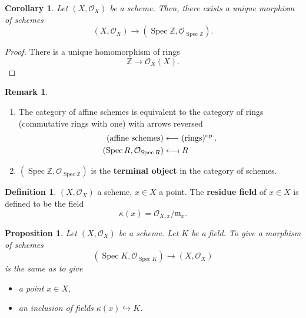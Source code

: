 \documentclass[12pt]{article}
\DeclareMathOperator{\Spec}{Spec}
\newtheorem*{proposition}{Proposition}
\newtheorem*{corollary}{Corollary}
\theoremstyle{definition}
\newtheorem*{definition}{Definition}
\newtheorem*{remark}{Remark}
\begin{document}
\begin{corollary}
Let $(X,\mathcal{O}_X)$ be a scheme. Then, there exists a unique morphism of schemes
\[(X,\mathcal{O}_X)\longrightarrow(\Spec\mathbb{Z},\mathcal{O}_{\Spec\mathbb{Z}}).\]
\end{corollary}

\begin{proof}
There is a unique homomorphism of rings
\[\mathbb{Z}\longrightarrow\mathcal{O}_X(X).\]
\end{proof}

\begin{remark}
\begin{enumerate}[label=\arabic*)]
\item The category of affine schemes is equivalent to the category of rings (commutative rings with one) with arrows reversed
\begin{align*}
(\text{affine schemes})&\longleftarrow(\text{rings})^{\text{op.}}.\\
(\Spec R,\mathcal{O}_{\Spec R})&\longleftarrow\!\shortmid R
\end{align*}

\item $(\Spec\mathbb{Z},\mathcal{O}_{\Spec\mathbb{Z}})$ is the \textbf{terminal object} in the category of schemes.
\end{enumerate}
\end{remark}

\begin{definition}
$(X,\mathcal{O}_X)$ a scheme, $x\in X$ a point. The \textbf{residue field} of $x\in X$ is defined to be the field
\[\kappa(x)=\mathcal{O}_{X,x}/\mathfrak{m}_x.\]
\end{definition}

\begin{proposition}
Let $(X,\mathcal{O}_X)$ be a scheme. Let $K$ be a field. To give a morphism of schemes
\[(\Spec K,\mathcal{O}_{\Spec K})\longrightarrow(X,\mathcal{O}_X)\]
is the same as to give
\begin{itemize}[label=$-$]
\item a point $x\in X$,
\item an inclusion of fields $\kappa(x)\hookrightarrow K$.
\end{itemize}
\end{proposition}
\end{document}
